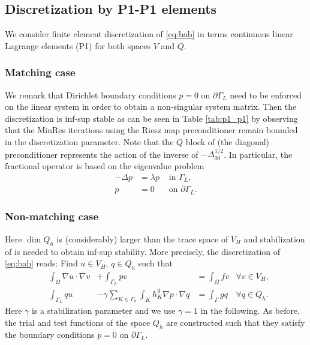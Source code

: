 \documentclass[r]{siamart171218}
\begin{document}
\subsection{Discretization by P1-P1 elements}\label{sec:p1_p1} We consider
finite element discretization of \eqref{eq:bab} in terms continuous linear
Lagrange elements (P1) for both spaces $V$ and $Q$.

\subsubsection{Matching case} We remark that Dirichlet boundary conditions
$p=0$ on $\partial\Gamma_L$ need to be enforced on the linear system in order
to obtain a non-singular system matrix. Then the discretization is inf-sup
stable as can be seen in Table \ref{tab:p1_p1} by observing that the MinRes
iterations using the Riesz map preconditioner remain bounded in the discretization
parameter. Note that the $Q$ block of (the diagonal) preconditioner represents
the action of the inverse of $-\Delta^{1/2}_{00}$. In particular, the fractional
operator is based on the eigenvalue problem
%
\[
\begin{aligned}
  -\Delta p &= \lambda p &\mbox{ in }\Gamma_L,\\
          p &= 0         &\mbox{ on }\partial\Gamma_L.
\end{aligned}
\]
%

\subsubsection{Non-matching case} Here $\dim Q_h$ is (considerably) larger
than the trace space of $V_H$ and stabilization of \cite{burman2009interior}
is needed to obtain inf-sup stability. More precisely, the discretization
of \eqref{eq:bab} reads: Find $u\in V_H$, $q\in Q_h$ such that
%
\begin{equation}\label{eq:p1_stab}
\begin{aligned}
&\int_{\Omega} \nabla u\cdot \nabla v &+ \int_{\Gamma_L}p v &= \int_{\Omega} f v &\forall v\in V_H,\\
  &\int_{\Gamma_L}q u  &-\gamma \sum_{K\in\Gamma_h}\int_{K} h_K^3\nabla p\cdot\nabla q &= \int_{\Gamma} g q &\forall q\in Q_h.
  \end{aligned}
\end{equation}
%
Here $\gamma$ is a stabilization parameter and we use $\gamma=1$ in the
following. As before, the trial and test functions of the space $Q_h$ are
constructed such that they satisfy the boundary conditions $p=0$ on $\partial\Gamma_L$.
\end{document}

